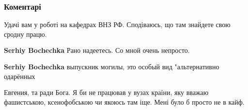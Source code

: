  
 
 
 
 
\subsubsection{Коментарі}

\begin{itemize}
 
Удачі вам у роботі на кафедрах ВНЗ РФ. Сподіваюсь, що там знайдете свою сродну працю.

\begin{itemize}
 
\textbf{Serhiy Bochechka} Рано надеетесь. Со мной очень непросто.

 
\textbf{Serhiy Bochechka} выпускник могилы, это особый вид "альтернативно одарённых

 
Евгения, та ради Бога. Я би не працював у вузах країни, яку вважаю фашистською, ксенофобською чи якоюсь там іще. Мені було б просто не в кайф.

 

\end{itemize}
\end{itemize}
